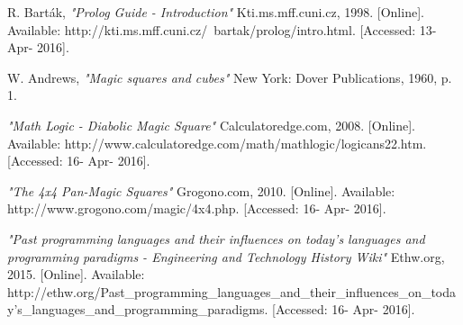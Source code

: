 \documentclass[12pt]{article}
\begin{document}

\begin{thebibliography}{10}
  R.  Barták,
  \emph{"Prolog Guide - Introduction"}
  Kti.ms.mff.cuni.cz,
  1998. [Online].
 Available: http://kti.ms.mff.cuni.cz/~bartak/prolog/intro.html. 
 [Accessed: 13- Apr- 2016].
 
  W. Andrews,
  \emph{"Magic squares and cubes"}
  New York: Dover Publications,
  1960, p. 1.
 
  \emph{"Math Logic - Diabolic Magic Square"}
  Calculatoredge.com,
  2008. [Online]. Available:   	    		http://www.calculatoredge.com/math/mathlogic/logicans22.htm. 
  [Accessed: 16- Apr- 2016].
 

  \emph{"The 4x4 Pan-Magic Squares"}
   Grogono.com,
   2010. [Online]. 
   Available: http://www.grogono.com/magic/4x4.php. 
   [Accessed: 16- Apr- 2016].
 
  \emph{"Past programming languages and their influences on today's languages and programming paradigms - Engineering and Technology History Wiki"}
   Ethw.org,
   2015. [Online]. 
   Available: http://ethw.org/Past\_programming\_languages\_and\_their\_influences\_on\_today's\_languages\_and\_programming\_paradigms. 
   [Accessed: 16- Apr- 2016].
 
 


 


\end{thebibliography}
\end{document}

